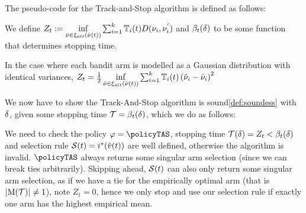 The pseudo-code for the Track-and-Stop algorithm is defined as follows:


We define $Z_t := \inf\limits_{\bar{\nu} \in \xi_{alt}(\hat{\nu}(t))} \sum_{i=1}^k \mathbb{T}_{i}(t) D(\nu_{i}, \nu_{i}^{'})$ and $\beta_t(\delta)$ to be some function that determines stopping time.

In the case where each bandit arm is modelled as a Gaussian distribution with identical variances, $Z_t = \frac{1}{2}\inf\limits_{\bar{\nu} \in \xi_{alt}(\hat{\nu}(t))} \sum_{i=1}^k \mathbb{T}_{i}(t) \left( \hat{\nu}_i - \bar{\nu}_i \right)^2$


We now have to show the Track-And-Stop algorithm is sound\ref{def:soundess} with $\delta$, given some stopping time $\mathcal{T} = \beta_t(\delta)$, which we do as follows:

We need to check the policy $\policy=\policyTAS$, stopping time $\mathcal{T}(\delta)=Z_t < \beta_t(\delta)$ and selection rule $\mathcal{S}(t) = i^*(\hat{v}(t))$ are well defined, otherwise the algorithm is invalid. $\policyTAS$ always returns some singular arm selection (since we can break ties arbitrarily). Skipping ahead, $\mathcal{S}(t)$ can also only return some singular arm selection, as if we have a tie for the empirically optimal arm (that is $|\mathrm{M}(\mathcal{T})| \neq 1$), note $Z_t=0$, hence we only stop and use our selection rule if exactly one arm has the highest empirical mean.

